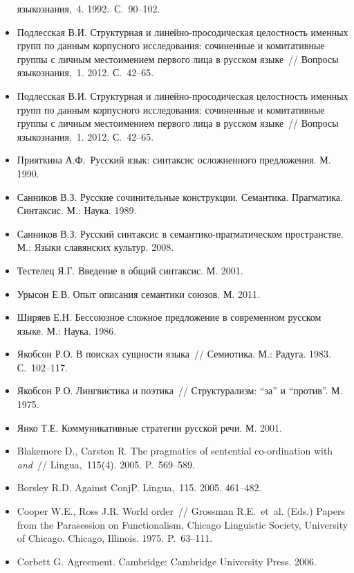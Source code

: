 \begin{itemize}
        языкознания,~4. 1992.~С.~90--102.
  \item
        Подлесская В.И. Структурная и линейно-просодическая целостность
        именных групп по данным корпусного исследования: сочиненные и
        комитативные группы с личным местоимением первого лица в русском
        языке~// Вопросы языкознания,~1. 2012. С.~42--65.
  \item
        Подлесская В.И. Структурная и линейно-просодическая целостность
        именных групп по данным корпусного исследования: сочиненные и
        комитативные группы с личным местоимением первого лица в русском
        языке~// Вопросы языкознания,~1. 2012. С.~42--65.
  \item
        Прияткина А.Ф.~Русский язык: синтаксис осложненного предложения. М.
        1990.
  \item
        Санников В.З. Русские сочинительные конструкции. Семантика.
        Прагматика. Синтаксис. М.: Наука. 1989.
  \item
        Санников В.З. Русский синтаксис в семантико-прагматическом
        пространстве. М.: Языки славянских культур. 2008.
  \item
        Тестелец Я.Г. Введение в общий синтаксис. М. 2001.
  \item
        Урысон Е.В. Опыт описания семантики союзов. М. 2011.
  \item
        Ширяев Е.Н. Бессоюзное сложное предложение в современном русском
        языке. М.: Наука. 1986.
  \item
        Якобсон Р.О. В поисках сущности языка~// Семиотика. М.: Радуга. 1983.
        С.~102--117.
  \item
        Якобсон Р.О. Лингвистика и поэтика~// Структурализм: ``за'' и
        ``против''. М. 1975.
  \item
        Янко Т.Е. Коммуникативные стратегии русской речи. М. 2001.
  \item
        Blakemore D., Carston R. The pragmatics of sentential co-ordination
        with \textit{and}~// Lingua,~115(4). 2005. P.~569--589.
  \item
        Borsley R.D. Against ConjP. Lingua,~115. 2005. 461--482.
  \item
        Cooper W.E., Ross J.R. World order~// Grossman R.E.~et~al. (Eds.)
        Papers from the Parasession on Functionalism, Chicago Linguistic
        Society, University of Chicago. Chicago, Illinois. 1975. P.~63--111.
  \item
        Corbett G. Agreement. Cambridge: Cambridge University Press. 2006.

\end{itemize}
